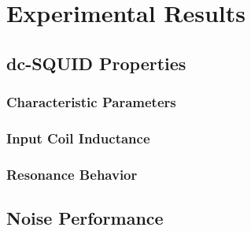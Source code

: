 \chapter{Experimental Results}

\section{dc-SQUID Properties}

\subsection{Characteristic Parameters}

\subsection{Input Coil Inductance}

\subsection{Resonance Behavior}

\section{Noise Performance}



